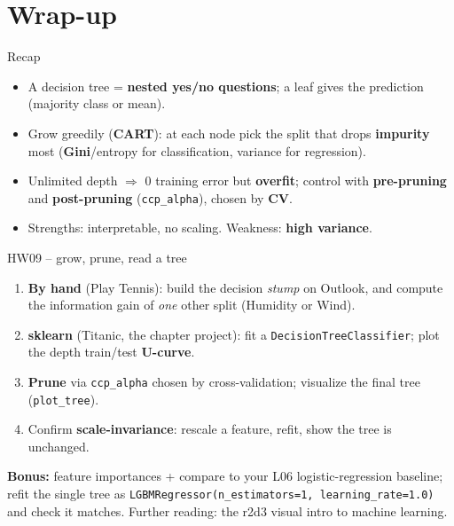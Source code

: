 \documentclass[aspectratio=169]{beamer}
\begin{document}
\section*{Wrap-up}

\begin{frame}{Recap}
  \begin{itemize}\small
    \item A decision tree = \textbf{nested yes/no questions}; a leaf gives the
      prediction (majority class or mean).
    \item Grow greedily (\textbf{CART}): at each node pick the split that drops
      \textbf{impurity} most (\textbf{Gini}/entropy for classification, variance for
      regression).
    \item Unlimited depth $\Rightarrow$ 0 training error but \textbf{overfit}; control
      with \textbf{pre-pruning} and \textbf{post-pruning} (\texttt{ccp\_alpha}), chosen
      by \textbf{CV}.
    \item Strengths: interpretable, no scaling. Weakness: \textbf{high variance}.
  \end{itemize}
  \vfill
\end{frame}

\begin{frame}{HW09 -- grow, prune, read a tree}
  \begin{enumerate}\small
    \item \textbf{By hand} (Play Tennis): build the decision \emph{stump} on Outlook,
      and compute the information gain of \emph{one} other split (Humidity or Wind).
    \item \textbf{sklearn} (Titanic, the chapter project): fit a
      \texttt{DecisionTreeClassifier}; plot the depth train/test \textbf{U-curve}.
    \item \textbf{Prune} via \texttt{ccp\_alpha} chosen by cross-validation; visualize
      the final tree (\texttt{plot\_tree}).
    \item Confirm \textbf{scale-invariance}: rescale a feature, refit, show the tree is
      unchanged.
  \end{enumerate}
  \vskip 2pt
  \textbf{Bonus:} feature importances + compare to your L06 logistic-regression
  baseline; refit the single tree as
  \texttt{LGBMRegressor(n\_estimators=1, learning\_rate=1.0)} and check it matches.
  Further reading: the r2d3 visual intro to machine learning.
\end{frame}
\end{document}
